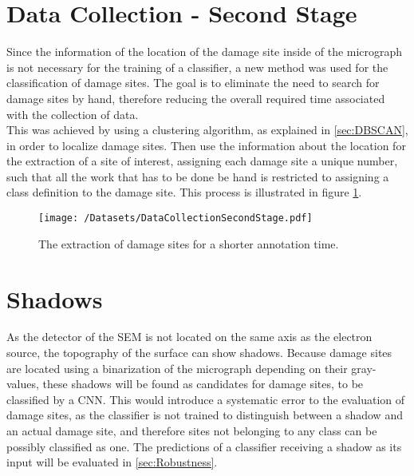 \section{Data Collection - Second Stage}

Since the information of the location of the damage site inside of the micrograph is not necessary for the training of a classifier, a new method was used for the classification of damage sites. The goal is to eliminate the need to search for damage sites by hand, therefore reducing the overall required time associated with the collection of data.\\

This was achieved by using a clustering algorithm, as explained in \ref{sec:DBSCAN}, in order to localize damage sites. Then use the information about the location for the extraction of a site of interest, assigning each damage site a unique number, such that all the work that has to be done be hand is restricted to assigning a class definition to the damage site. This process is illustrated in figure \ref{fig:LabelingSecondStage}.

\begin{figure}
\centering
\texttt{[image: /Datasets/DataCollectionSecondStage.pdf]}
\caption{The extraction of damage sites for a shorter annotation time.}
\label{fig:LabelingSecondStage}
\end{figure}

\section{Shadows}
\label{sec:Shadows}

As the detector of the SEM is not located on the same axis as the electron source, the topography of the surface can show shadows. Because damage sites are located using a binarization of the micrograph depending on their gray-values, these shadows will be found as candidates for damage sites, to be classified by a CNN. This would introduce a systematic error to the evaluation of damage sites, as the classifier is not trained to distinguish between a shadow and an actual damage site, and therefore sites not belonging to any class can be possibly classified as one. The predictions of a classifier receiving a shadow as its input will be evaluated in \ref{sec:Robustness}.


